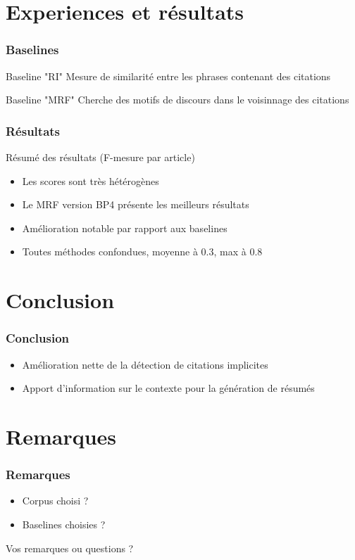 \documentclass[12pt]{beamer}
\begin{document}
\section{Experiences et résultats}
\begin{frame}
  \frametitle{Baselines}
  \begin{block}{Baseline "RI"}
    Mesure de similarité entre les phrases contenant des citations
  \end{block}
  \begin{block}{Baseline "MRF"}
    Cherche des motifs de discours dans le voisinnage des citations 
  \end{block}
\end{frame}

\begin{frame}
  \frametitle{Résultats}
  Résumé des résultats (F-mesure par article)
  \begin{itemize}
   \item Les scores sont très hétérogènes
   \item Le MRF version BP4 présente les meilleurs résultats
   \item Amélioration notable par rapport aux baselines
   \item Toutes méthodes confondues, moyenne à 0.3, max à 0.8
  \end{itemize}


\end{frame}

\section{Conclusion}
\begin{frame}
  \frametitle{Conclusion}

  \begin{itemize}
    \item Amélioration nette de la détection de citations implicites
    \item Apport d'information sur le contexte pour la génération de résumés
  \end{itemize}
\end{frame}

\section{Remarques}
\begin{frame}
  \frametitle{Remarques}

  \begin{itemize}
    \item Corpus choisi ?
    \item Baselines choisies ?
  \end{itemize}
  
  Vos remarques ou questions ?
\end{frame}
\end{document}
